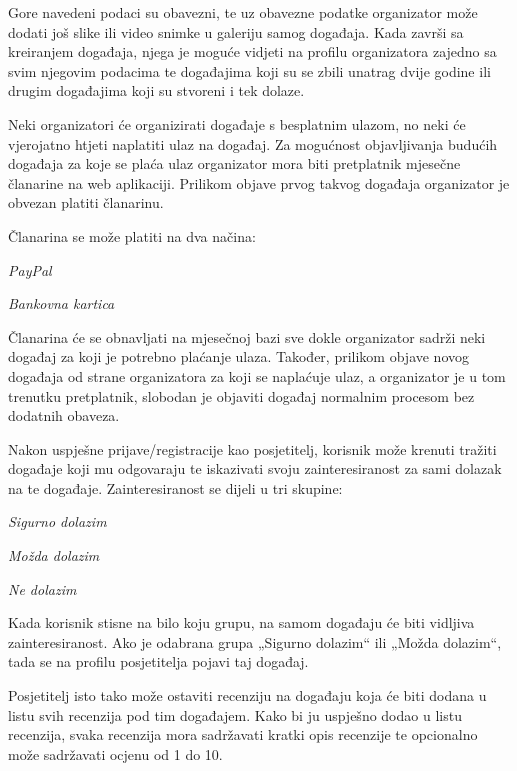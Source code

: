 		Gore navedeni podaci su obavezni, te uz obavezne podatke organizator može dodati još slike ili video snimke u galeriju samog događaja. Kada završi sa kreiranjem događaja, njega je moguće vidjeti na profilu organizatora zajedno sa svim njegovim podacima te događajima koji su se zbili unatrag dvije godine ili drugim događajima koji su stvoreni i tek dolaze.
		
		Neki organizatori će organizirati događaje s besplatnim ulazom, no neki će vjerojatno htjeti naplatiti ulaz na događaj. Za mogućnost objavljivanja budućih događaja za koje se plaća ulaz organizator mora biti pretplatnik mjesečne članarine na web aplikaciji. Prilikom objave prvog takvog događaja organizator je obvezan platiti članarinu. 
		
		Članarina se može platiti na dva načina:
		\begin{packed_item}
			\item \textit{PayPal}
			\item \textit{Bankovna kartica}
		\end{packed_item}
		
		Članarina će se obnavljati na mjesečnoj bazi sve dokle organizator sadrži neki događaj za koji je potrebno plaćanje ulaza. Također, prilikom objave novog događaja od strane organizatora za koji se naplaćuje ulaz, a organizator je u tom trenutku pretplatnik, slobodan je objaviti događaj normalnim procesom bez dodatnih obaveza.
		
		Nakon uspješne prijave/registracije kao posjetitelj, korisnik može krenuti tražiti događaje koji mu odgovaraju te iskazivati svoju zainteresiranost za sami dolazak na te događaje. Zainteresiranost se dijeli u tri skupine: 
		\begin{packed_item}
			\item \textit{Sigurno dolazim}
			\item \textit{Možda dolazim}
			\item \textit{Ne dolazim}
		\end{packed_item}
		
		Kada korisnik stisne na bilo koju grupu, na samom događaju će biti vidljiva zainteresiranost. Ako je odabrana grupa „Sigurno dolazim“ ili „Možda dolazim“, tada se na profilu posjetitelja pojavi taj događaj. 
		
		Posjetitelj isto tako može ostaviti recenziju na događaju koja će biti dodana u listu svih recenzija pod tim događajem. Kako bi ju uspješno dodao u listu recenzija, svaka recenzija mora sadržavati kratki opis recenzije te opcionalno može sadržavati ocjenu od 1 do 10. 
		
